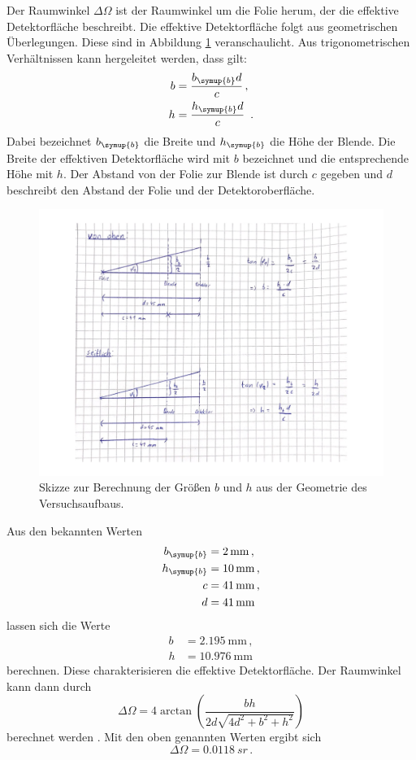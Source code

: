 Der Raumwinkel $\Delta \Omega$ ist der Raumwinkel um die Folie herum, der die
effektive Detektorfläche beschreibt. Die effektive Detektorfläche folgt aus geometrischen
Überlegungen. Diese sind in Abbildung \ref{fig:skizze} veranschaulicht.
Aus trigonometrischen Verhältnissen kann hergeleitet werden, dass gilt:
\begin{align*}
  b &= \frac{b_{\symup{b}} d}{c} \,,\\
  h &= \frac{h_{\symup{b}} d}{c} \,.
\end{align*}
Dabei bezeichnet $b_{\symup{b}}$ die Breite und $h_{\symup{b}}$ die Höhe der Blende.
Die Breite der effektiven Detektorfläche wird mit $b$ bezeichnet und die entsprechende Höhe mit $h$.
Der Abstand von der Folie zur Blende ist durch $c$ gegeben und $d$ beschreibt den Abstand
der Folie und der Detektoroberfläche.
\begin{figure}[h]
  \centering
  \includegraphics[width=\textwidth]{images/skizze.pdf}
  \caption{Skizze zur Berechnung der Größen $b$ und $h$ aus der Geometrie des Versuchsaufbaus.}
  \label{fig:skizze}
\end{figure}

Aus den bekannten Werten \cite{Versuchsanleitung}
\begin{align*}
  b_{\symup{b}} &= \SI{2}{\milli\meter} \,, \\
  h_{\symup{b}} &= \SI{10}{\milli\meter} \,, \\
  c &= \SI{41}{\milli\meter} \,,\\
  d &= \SI{41}{\milli\meter}
\end{align*}
lassen sich die Werte
\begin{align*}
  b &= \SI{2.195}{\milli\meter} \,,\\
  h &= \SI{10.976}{\milli\meter}
\end{align*}
berechnen. Diese charakterisieren die effektive Detektorfläche. Der Raumwinkel kann dann durch
\begin{equation}
  \Delta \Omega = 4 \arctan\left(\frac{b h}{2d \sqrt{4d^2 + b^2 + h^2}}\right)
\end{equation}
berechnet werden \cite{raumwinkel}. Mit den oben genannten Werten ergibt sich
\begin{equation*}
  \Delta \Omega = \SI{0.0118}{sr} \,.
\end{equation*}

